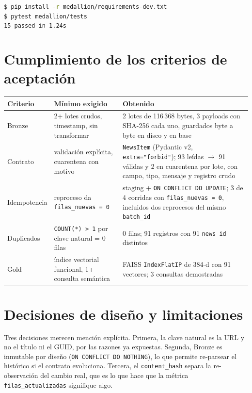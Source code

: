 \documentclass[11pt,a4paper]{article}
\begin{document}
\begin{lstlisting}[language=bash]
$ pip install -r medallion/requirements-dev.txt
$ pytest medallion/tests
15 passed in 1.24s
\end{lstlisting}

\section{Cumplimiento de los criterios de aceptación}

\begin{center}
\small
\begin{tabular}{@{}p{2.3cm}p{5.6cm}p{7.4cm}@{}}
\toprule
\textbf{Criterio} & \textbf{Mínimo exigido} & \textbf{Obtenido} \\
\midrule
Bronze & 2+ lotes crudos, timestamp, sin transformar &
2 lotes de 116\,368 bytes, 3 payloads con SHA-256 cada uno, guardados byte a
byte en disco y en base \\
\addlinespace
Contrato & validación explícita, cuarentena con motivo &
\texttt{NewsItem} (Pydantic v2, \texttt{extra="forbid"}); 93 leídas $\rightarrow$
91 válidas y 2 en cuarentena por lote, con campo, tipo, mensaje y registro crudo \\
\addlinespace
Idempotencia & reproceso da \texttt{filas\_nuevas = 0} &
staging + \texttt{ON CONFLICT DO UPDATE}; 3 de 4 corridas con
\texttt{filas\_nuevas = 0}, incluidos dos reprocesos del mismo \texttt{batch\_id} \\
\addlinespace
Duplicados & \texttt{COUNT(*) > 1} por clave natural = 0 filas &
0 filas; 91 registros con 91 \texttt{news\_id} distintos \\
\addlinespace
Gold & índice vectorial funcional, 1+ consulta semántica &
FAISS \texttt{IndexFlatIP} de 384-d con 91 vectores; 3 consultas demostradas \\
\bottomrule
\end{tabular}
\end{center}

\section{Decisiones de diseño y limitaciones}

Tres decisiones merecen mención explícita. Primera, la clave natural es la URL y
no el título ni el GUID, por las razones ya expuestas. Segunda, Bronze es
inmutable por diseño (\texttt{ON CONFLICT DO NOTHING}), lo que permite re-parsear
el histórico si el contrato evoluciona. Tercera, el \texttt{content\_hash}
separa la re-observación del cambio real, que es lo que hace que la métrica
\texttt{filas\_actualizadas} signifique algo.
\end{document}
